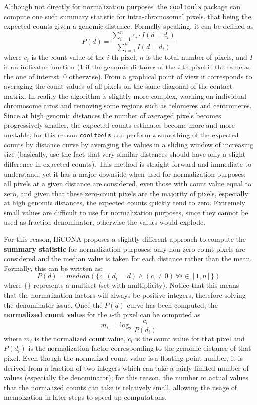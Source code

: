 Although not directly for normalization purposes, the \texttt{cooltools} package\cite{cooltools2022} can compute one such summary statistic for intra-chromosomal pixels, that being the expected counts given a genomic distance. Formally speaking, it can be defined as
$$P\left(d\right) = \frac{\sum_{i=1}^n c_i \cdot I(d = d_i)}{\sum_{i=1}^n I(d = d_i)}$$
where $c_i$ is the count value of the $i$-th pixel, $n$ is the total number of pixels, and $I$ is an indicator function (1 if the genomic distance of the $i$-th pixel is the same as the one of interest, 0 otherwise). From a graphical point of view it corresponds to averaging the count values of all pixels on the same diagonal of the contact matrix. In reality the algorithm is slightly more complex, working on individual chromosome arms and removing some regions such as telomeres and centromeres. Since at high genomic distances the number of averaged pixels becomes progressively smaller, the expected counts estimates become more and more unstable; for this reason \texttt{cooltools} can perform a smoothing of the expected counts by distance curve by averaging the values in a sliding window of increasing size (basically, use the fact that very similar distances should have only a slight difference in expected counts). 
This method is straight forward and immediate to understand, yet it has a major downside when used for normalization purposes: all pixels at a given distance are considered, even those with count value equal to zero, and given that these zero-count pixels are the majority of pixels, especially at high genomic distances, the expected counts quickly tend to zero. Extremely small values are difficult to use for normalization purposes, since they cannot be used as fraction denominator, otherwise the values would explode.

For this reason, HiCONA proposes a slightly different approach to compute the \textbf{summary statistic} for normalization purposes: only non-zero count pixels are considered and the median value is taken for each distance rather than the mean. Formally, this can be written as:
$$P\left(d\right) = median(\{c_i|(d_i=d) \land (c_i \neq 0) \, \forall i \in [1,n]\})$$ 
where $\{\}$ represents a multiset (set with multiplicity).
Notice that this means that the normalization factors will always be positive integers, therefore solving the denominator issue. Once the $P(d)$ curve has been computed, the \textbf{normalized count value} for the $i$-th pixel can be computed as
$$m_i = \log_2 \frac{c_i}{P(d_i)}$$
where $m_i$ is the normalized count value, $c_i$ is the count value for that pixel and $P(d_i)$ is the normalization factor corresponding to the genomic distance of that pixel. Even though the normalized count value is a floating point number, it is derived from a fraction of two integers which can take a fairly limited number of values (especially the denominator); for this reason, the number or actual values that the normalized counts can take is relatively small, allowing the usage of memoization in later steps to speed up computations.
 
